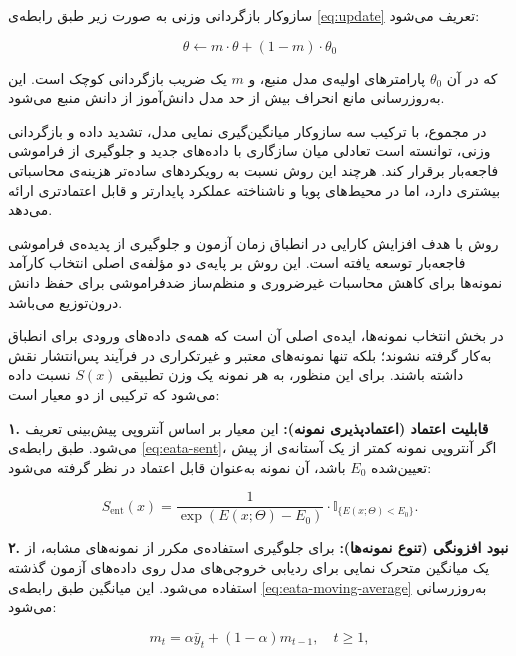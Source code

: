 سازوکار بازگردانی وزنی به صورت زیر طبق رابطه‌ی \ref{eq:update} تعریف می‌شود\cite{cotta}:  

\begin{equation}
	\theta \leftarrow m \cdot \theta + (1-m) \cdot \theta_0
	\label{eq:update}
\end{equation}


که در آن \(\theta_0\) پارامترهای اولیه‌ی مدل منبع، و \(m\) یک ضریب بازگردانی کوچک است. این به‌روزرسانی مانع انحراف بیش از حد مدل دانش‌آموز از دانش منبع می‌شود.  

در مجموع،  با ترکیب سه سازوکار میانگین‌گیری نمایی مدل، تشدید داده و بازگردانی وزنی، توانسته است تعادلی میان سازگاری با داده‌های جدید و جلوگیری از فراموشی فاجعه‌بار برقرار کند. هرچند این روش نسبت به رویکردهای ساده‌تر هزینه‌ی محاسباتی بیشتری دارد، اما در محیط‌های پویا و ناشناخته عملکرد پایدارتر و قابل اعتمادتری ارائه می‌دهد.  


روش  با هدف افزایش کارایی در انطباق زمان آزمون و جلوگیری از پدیده‌ی فراموشی فاجعه‌بار توسعه یافته است. این روش بر پایه‌ی دو مؤلفه‌ی اصلی انتخاب کارآمد نمونه‌ها برای کاهش محاسبات غیرضروری و منظم‌ساز ضدفراموشی برای حفظ دانش درون‌توزیع می‌باشد. 

در بخش انتخاب نمونه‌ها، ایده‌ی اصلی آن است که همه‌ی داده‌های ورودی برای انطباق به‌کار گرفته نشوند؛ بلکه تنها نمونه‌های معتبر و غیرتکراری در فرآیند {پس‌انتشار} نقش داشته باشند. برای این منظور، به هر نمونه یک وزن تطبیقی \(S(x)\) نسبت داده می‌شود که ترکیبی از دو معیار است:  

\textbf{۱. قابلیت اعتماد (اعتمادپذیری نمونه):} این معیار بر اساس آنتروپی پیش‌بینی تعریف می‌شود. طبق رابطه‌ی \ref{eq:eata-sent}، اگر آنتروپی نمونه کمتر از یک آستانه‌ی از پیش تعیین‌شده \(E_0\) باشد، آن نمونه به‌عنوان قابل اعتماد در نظر گرفته می‌شود\cite{eata}:  

\begin{equation}
	S_{\text{ent}}(x) = \frac{1}{\exp(E(x; \Theta) - E_0)} \cdot \mathbb{I}_{\{E(x; \Theta) < E_0\}}.
	\label{eq:eata-sent}
\end{equation}

\textbf{۲. نبود افزونگی (تنوع نمونه‌ها):} برای جلوگیری استفاده‌ی مکرر از نمونه‌های مشابه، از یک میانگین متحرک نمایی برای ردیابی خروجی‌های مدل روی داده‌های آزمون گذشته استفاده می‌شود. این میانگین طبق رابطه‌ی \ref{eq:eata-moving-average} به‌روزرسانی می‌شود\cite{eata}:  

\begin{equation}
	m_t = \alpha \bar{y}_t + (1 - \alpha) m_{t-1}, \quad t \geq 1,
	\label{eq:eata-moving-average}
\end{equation}

